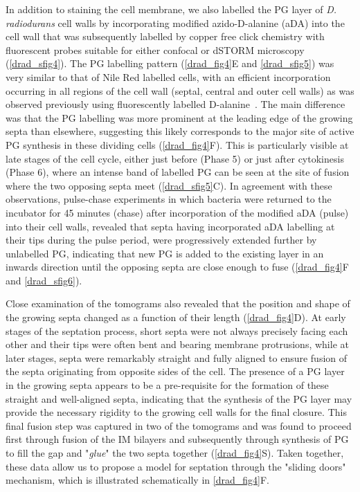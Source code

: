 In addition to staining the cell membrane, we also labelled the PG layer of \textit{D. radiodurans} cell walls by incorporating modified azido-D-alanine (aDA) into the cell wall that was subsequently labelled by copper free click chemistry with fluorescent probes suitable for either confocal or dSTORM microscopy~\cite{trouveNanoscaleDynamicsPeptidoglycan2021,trouveMetabolicBiorthogonalLabeling2021} (\autoref{drad_sfig4}).
The PG labelling pattern (\autoref{drad_fig4}E and \autoref{drad_sfig5}) was very similar to that of Nile Red labelled cells, with an efficient incorporation occurring in all regions of the cell wall (septal, central and outer cell walls) as was observed previously using fluorescently labelled D-alanine~\cite{flochCellMorphologyNucleoid2019}.
The main difference was that the PG labelling was more prominent at the leading edge of the growing septa than elsewhere, suggesting this likely corresponds to the major site of active PG synthesis in these dividing cells (\autoref{drad_fig4}F).
This is particularly visible at late stages of the cell cycle, either just before (Phase 5) or just after cytokinesis (Phase 6), where an intense band of labelled PG can be seen at the site of fusion where the two opposing septa meet (\autoref{drad_sfig5}C).
In agreement with these observations, pulse-chase experiments in which bacteria were returned to the incubator for 45 minutes (chase) after incorporation of the modified aDA (pulse) into their cell walls, revealed that septa having incorporated aDA labelling at their tips during the pulse period, were progressively extended further by unlabelled PG, indicating that new PG is added to the existing layer in an inwards direction until the opposing septa are close enough to fuse (\autoref{drad_fig4}F and \autoref{drad_sfig6}).

Close examination of the tomograms also revealed that the position and shape of the growing septa changed as a function of their length (\autoref{drad_fig4}D).
At early stages of the septation process, short septa were not always precisely facing each other and their tips were often bent and bearing membrane protrusions, while at later stages, septa were remarkably straight and fully aligned to ensure fusion of the septa originating from opposite sides of the cell.
The presence of a PG layer in the growing septa appears to be a pre-requisite for the formation of these straight and well-aligned septa, indicating that the synthesis of the PG layer may provide the necessary rigidity to the growing cell walls for the final closure.
This final fusion step was captured in two of the tomograms and was found to proceed first through fusion of the IM bilayers and subsequently through synthesis of PG to fill the gap and "\textit{glue}" the two septa together (\autoref{drad_fig4}S).
Taken together, these data allow us to propose a model for septation through the "sliding doors" mechanism, which is illustrated schematically in \autoref{drad_fig4}F.

